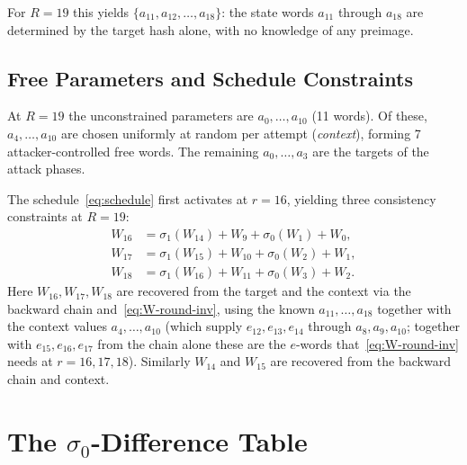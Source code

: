 \documentclass[11pt,a4paper]{article}
\newcommand{\sig}[1]{\sigma_{#1}}
\begin{document}
For $R = 19$ this yields $\{a_{11}, a_{12}, \ldots, a_{18}\}$:
the state words $a_{11}$ through $a_{18}$ are determined by the target
hash alone, with no knowledge of any preimage.

\subsection{Free Parameters and Schedule Constraints}

At $R=19$ the unconstrained parameters are $a_0,\ldots,a_{10}$
(11 words).  Of these, $a_4,\ldots,a_{10}$ are chosen uniformly at
random per attempt (\emph{context}), forming 7 attacker-controlled
free words.  The remaining $a_0,\ldots,a_3$ are the targets of the
attack phases.

The schedule~\eqref{eq:schedule} first activates at $r=16$, yielding
three consistency constraints at $R=19$:
\begin{align}
  W_{16} &= \sig{1}(W_{14}) + W_9 + \sig{0}(W_1) + W_0, \tag{C0}\\
  W_{17} &= \sig{1}(W_{15}) + W_{10} + \sig{0}(W_2) + W_1, \tag{C1}\\
  W_{18} &= \sig{1}(W_{16}) + W_{11} + \sig{0}(W_3) + W_2. \tag{C2}
\end{align}
Here $W_{16}, W_{17}, W_{18}$ are recovered from the target and the context via the
backward chain and~\eqref{eq:W-round-inv}, using the known
$a_{11},\ldots,a_{18}$ together with the context values
$a_4,\ldots,a_{10}$ (which supply $e_{12},e_{13},e_{14}$ through $a_8,a_9,a_{10}$; together with $e_{15},e_{16},e_{17}$ from the chain alone these are the $e$-words that~\eqref{eq:W-round-inv} needs at $r=16,17,18$).  Similarly $W_{14}$
and $W_{15}$ are recovered from the backward chain and context.

\section{The \texorpdfstring{$\sigma_0$}{sigma0}-Difference Table}
\label{sec:table}
\end{document}
